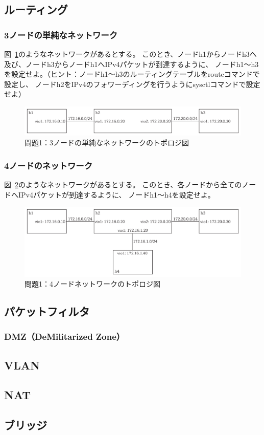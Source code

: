 
\subsection{ルーティング}


\subsubsection{3ノードの単純なネットワーク}

図~\ref{fig:quiz01}のようなネットワークがあるとする。
このとき、ノードh1からノードh3へ及び、ノードh3からノードh1へIPv4パケットが到達するように、
ノードh1〜h3を設定せよ。（ヒント：ノードh1〜h3のルーティングテーブルをrouteコマンドで設定し、
ノードh2をIPv4のフォワーディングを行うようにsysctlコマンドで設定せよ）

\begin{figure}
    \centering
    \includegraphics[width=15cm,pagebox=artbox]{figs/quiz01.pdf}
    \caption{問題1：3ノードの単純なネットワークのトポロジ図} \label{fig:quiz01}
\end{figure}

\subsubsection{4ノードのネットワーク}

図~\ref{fig:quiz02}のようなネットワークがあるとする。
このとき、各ノードから全てのノードへIPv4パケットが到達するように、
ノードh1〜h4を設定せよ。

\begin{figure}
    \centering
    \includegraphics[width=15cm,pagebox=artbox]{figs/quiz02.pdf}
    \caption{問題1：4ノードネットワークのトポロジ図} \label{fig:quiz02}
\end{figure}

\subsection{パケットフィルタ}

\subsubsection{DMZ（DeMilitarized Zone）}


\subsection{VLAN}

\subsection{NAT}

\subsection{ブリッジ}